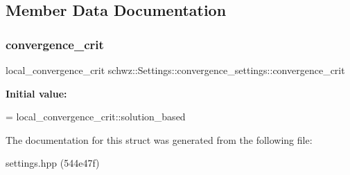 \subsection{Member Data Documentation}
\mbox{\label{structschwz_1_1Settings_1_1convergence__settings_a509f2b6af29a7afeafda9d45f8e12623}} 
\subsubsection{\texorpdfstring{convergence\+\_\+crit}{convergence\_crit}}
{\footnotesize\ttfamily local\+\_\+convergence\+\_\+crit schwz\+::\+Settings\+::convergence\+\_\+settings\+::convergence\+\_\+crit}

{\bfseries Initial value\+:}
\begin{DoxyCode}
=
            local\_convergence\_crit::solution\_based
\end{DoxyCode}


The documentation for this struct was generated from the following file\+:\begin{DoxyCompactItemize}
\item 
settings.\+hpp (544e47f)\end{DoxyCompactItemize}
